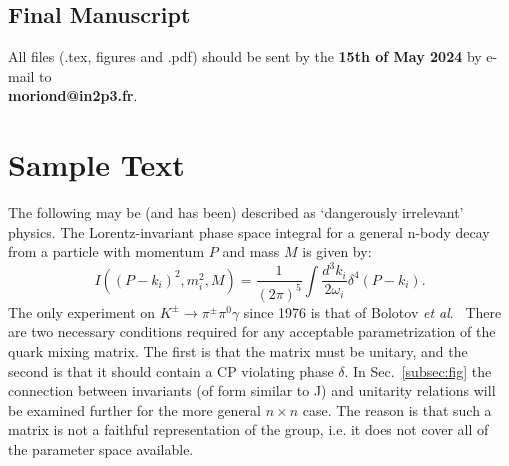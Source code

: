 \documentclass{moriond}
\def\ra{\rightarrow}
\begin{document}
\subsection{Final Manuscript}\label{subsec:final}

All files (.tex, figures and .pdf) should be sent by the {\bf 15th of May 2024}
by e-mail 
to \\
{\bf moriond@in2p3.fr}.\\

\section{Sample Text }

The following may be (and has been) described as `dangerously irrelevant'
physics. The Lorentz-invariant phase space integral for
a general n-body decay from a particle with momentum $P$
and mass $M$ is given by:
\begin{equation}
I((P - k_i)^2, m^2_i, M) = \frac{1}{(2 \pi)^5}\!
\int\!\frac{d^3 k_i}{2 \omega_i} \! \delta^4(P - k_i).
\label{eq:murnf}
\end{equation}
The only experiment on $K^{\pm} \ra \pi^{\pm} \pi^0 \gamma$ since 1976
is that of Bolotov {\it et al}.~\cite{bu}
        There are two
necessary conditions required for any acceptable
parametrization of the
quark mixing matrix. The first is that the matrix must be unitary, and the
second is that it should contain a CP violating phase $\delta$.
 In Sec.~\ref{subsec:fig} the connection between invariants (of
form similar to J) and unitarity relations
will be examined further for the more general $ n \times n $ case.
The reason is that such a matrix is not a faithful representation of the group,
i.e. it does not cover all of the parameter space available.
\end{document}
